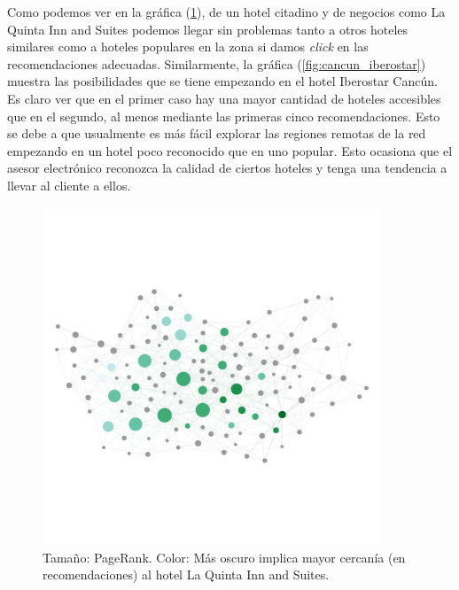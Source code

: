 \documentclass[12pt]{report}
\begin{document}
Como podemos ver en la gráfica (\ref{fig:cancun_laquinta}), de un hotel citadino y de negocios como La Quinta Inn and Suites podemos llegar sin problemas tanto a otros hoteles similares como a hoteles populares en la zona si damos \emph{click} en las recomendaciones adecuadas. Similarmente, la gráfica (\ref{fig:cancun_iberostar}) muestra las posibilidades que se tiene empezando en el hotel Iberostar Cancún. Es claro ver que en el primer caso hay una mayor cantidad de hoteles accesibles que en el segundo, al menos mediante las primeras cinco recomendaciones. Esto se debe a que usualmente es más fácil explorar las regiones remotas de la red empezando en un hotel poco reconocido que en uno popular. Esto ocasiona que el asesor electrónico reconozca la calidad de ciertos hoteles y tenga una tendencia a llevar al cliente a ellos. 
\begin{figure}[h!t]
	\centering
	\includegraphics[width=0.9\textwidth, angle=0,
		trim = 100 900 100 900, clip]{imagenes/cancun_laquinta2.png}
	\caption{\label{fig:cancun_laquinta} Tamaño: PageRank. Color: Más oscuro implica mayor cercanía (en recomendaciones) al hotel La Quinta Inn and Suites.\\\vspace*{1cm}}

\end{figure}
\end{document}
